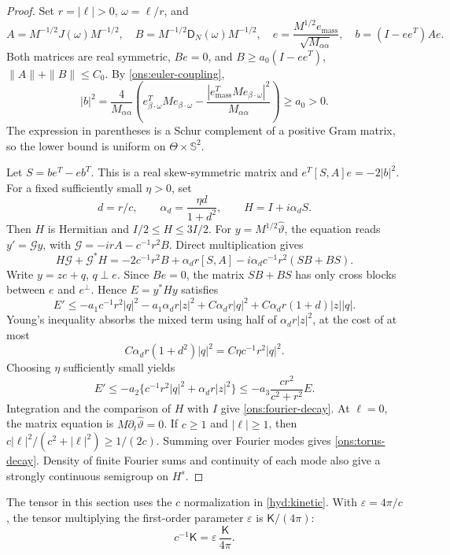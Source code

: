 \begin{proof}
 Set $r=|\ell|>0$, $\omega=\ell/r$, and
 \[
 A=M^{-1/2}J(\omega)M^{-1/2},\quad
 B=M^{-1/2}\mathsf D_N(\omega)M^{-1/2},\quad
 e=\frac{M^{1/2}e_{\mathrm{mass}}}{\sqrt{M_{\alpha\alpha}}},\quad
 b=(I-ee^T)Ae.
 \]
 Both matrices are real symmetric, $Be=0$, and
 $B\ge a_0(I-ee^T)$, $\|A\|+\|B\|\le C_0$.
 By \eqref{ons:euler-coupling},
 \[
 |b|^2=\frac4{M_{\alpha\alpha}}
 \left(e_{\beta\cdot\omega}^TMe_{\beta\cdot\omega}
       -\frac{|e_{\mathrm{mass}}^TMe_{\beta\cdot\omega}|^2}
                    {M_{\alpha\alpha}}\right)\ge a_0>0.
 \]
 The expression in parentheses is a Schur complement of a positive
 Gram matrix, so the lower bound is uniform on
 $\Theta\times\mathbb S^2$.

 Let $S=be^T-eb^T$. This is a real skew-symmetric matrix and
 $e^T[S,A]e=-2|b|^2$. For a fixed sufficiently small $\eta>0$, set
 \[
 d=r/c,\qquad \alpha_d=\frac{\eta d}{1+d^2},\qquad
 H=I+i\alpha_dS.
 \]
 Then $H$ is Hermitian and $I/2\le H\le3I/2$.
 For $y=M^{1/2}\widehat\vartheta$, the equation reads
 $y'=\mathcal Gy$, with $\mathcal G=-irA-c^{-1}r^2B$.
 Direct multiplication gives
 \begin{equation}\label{ons:compensated-matrix}
 H\mathcal G+\mathcal G^*H
 =-2c^{-1}r^2B+\alpha_dr[S,A]
       -i\alpha_dc^{-1}r^2(SB+BS).
 \end{equation}
 Write $y=ze+q$, $q\perp e$. Since $Be=0$, the matrix $SB+BS$
 has only cross blocks between $e$ and $e^\perp$.
 Hence $E=y^*Hy$ satisfies
 \[
 E'\le-a_1c^{-1}r^2|q|^2-a_1\alpha_dr|z|^2
       +C\alpha_dr|q|^2+C\alpha_dr(1+d)|z||q|.
 \]
 Young's inequality absorbs the mixed term using half of
 $\alpha_dr|z|^2$, at the cost of at most
 \[
 C\alpha_dr(1+d^2)|q|^2=C\eta c^{-1}r^2|q|^2.
 \]
 Choosing $\eta$ sufficiently small yields
 \[
 E'\le-a_2\{c^{-1}r^2|q|^2+\alpha_dr|z|^2\}
       \le-a_3\frac{cr^2}{c^2+r^2}E.
 \]
 Integration and the comparison of $H$ with $I$ give
 \eqref{ons:fourier-decay}. At $\ell=0$, the matrix equation is
 $M\partial_t\widehat\vartheta=0$.
 If $c\ge1$ and $|\ell|\ge1$, then
 $c|\ell|^2/(c^2+|\ell|^2)\ge1/(2c)$.
 Summing over Fourier modes gives \eqref{ons:torus-decay}.
 Density of finite Fourier sums and continuity of each mode also
 give a strongly continuous semigroup on $H^s$.
\end{proof}

The tensor in this section uses the $c$ normalization in
\eqref{hyd:kinetic}. With $\varepsilon=4\pi/c$, the tensor multiplying
the first-order parameter $\varepsilon$ is $\mathsf K/(4\pi)$:
\[
 c^{-1}\mathsf K=\varepsilon\,\frac{\mathsf K}{4\pi}.
\]
